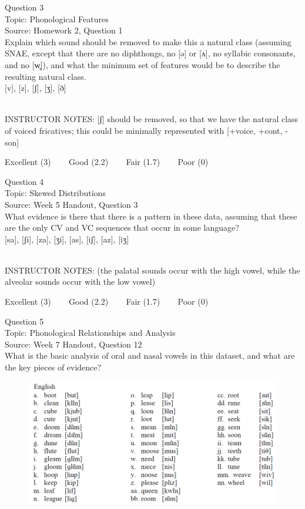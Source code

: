 \documentclass[12pt]{article}
\begin{document}
{\large Question 3}\\

Topic: Phonological Features\\
Source: Homework 2, Question 1\\

Explain which sound should be removed to make this a natural class (assuming SNAE, except that there are no diphthongs, no [ə] or [ʌ], no syllabic consonants, and no [w̥]), and what the minimum set of features would be to describe the resulting natural class.\\

{[v]}, {[z]}, {[ʃ]}, {[ʒ]}, {[ð]}


~\\
INSTRUCTOR NOTES: [ʃ] should be removed, so that we have the natural class of voiced fricatives; this could be minimally represented with [+voice, +cont, -son]


\vfill
Excellent (3) ~~~ Good (2.2) ~~~ Fair (1.7) ~~~ Poor (0)
\newpage

{\large Question 4}\\

Topic: Skewed Distributions\\
Source: Week 5 Handout, Question 3\\

What evidence is there that there is a pattern in these data, assuming that these are the only CV and VC sequences that occur in some language?\\

{[sa]}, {[ʃi]}, {[za]}, {[ʒi]}, {[as]}, {[iʃ]}, {[az]}, {[iʒ]}


~\\
INSTRUCTOR NOTES: (the palatal sounds occur with the high vowel, while the alveolar sounds occur with the low vowel)


\vfill
Excellent (3) ~~~ Good (2.2) ~~~ Fair (1.7) ~~~ Poor (0)
\newpage

{\large Question 5}\\

Topic: Phonological Relationships and Analysis\\
Source: Week 7 Handout, Question 12\\

What is the basic analysis of oral and nasal vowels in this dataset, and what are the key pieces of evidence?\\

\begin{figure}[H]
\includegraphics{../images/english12.png}
\end{figure}
\end{document}
